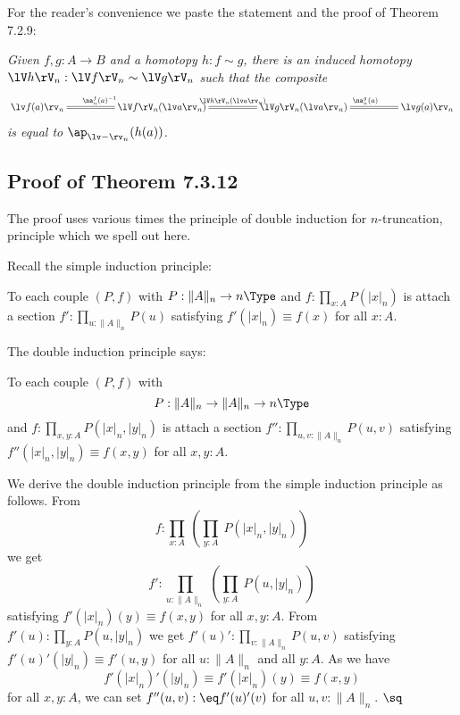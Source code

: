 \documentclass[12pt]{article}
\begin{document}
For the reader's convenience we paste the statement and the proof of Theorem 7.2.9:

\nn{} \emph{Given $f,g:A\to B$ and a homotopy $h:f\sim g$, there is an induced homotopy $\lV h\rV_n:\lV f\rV_n\sim\lV g\rV_n$ such that the composite
\begin{equation}\label{735}
\xymatrix@C=50pt{
\lv f(a)\rv_n\ar@{=}[r]^{\na^f_n(a)^{-1}}&
\lV f\rV_n(\lv a\rv_n)\ar@{=}[r]^{\lV h\rV_n(\lv a\rv_n)}&
\lV g\rV_n(\lv a\rv_n)\ar@{=}[r]^{\na^g_n(a)}&
\lv g(a)\rv_n}
\end{equation}
is equal to $\ap_{\lv-\rv_n}(h(a))$.}


\subsection{Proof of Theorem 7.3.12}

The proof uses various times the principle of double induction for $n$-truncation, principle which we spell out here.

Recall the simple induction principle:

To each couple $(P,f)$ with $P:\lVert A\rVert_n\to n\Type$ and $f:\prod_{x:A}P(\lvert x\rvert_n)$ is attach a section $f':\prod_{u:\lVert A\rVert_n}P(u)$ satisfying $f'(\lvert x\rvert_n)\equiv f(x)$ for all $x:A$.

The double induction principle says:

To each couple $(P,f)$ with $$P:\lVert A\rVert_n\to\lVert A\rVert_n\to n\Type$$ and $f:\prod_{x,y:A}P(\lvert x\rvert_n,\lvert y\rvert_n)$ is attach a section $f'':\prod_{u,v:\lVert A\rVert_n}P(u,v)$ satisfying $f''(\lvert x\rvert_n,\lvert y\rvert_n)\equiv f(x,y)$ for all $x,y:A$.

We derive the double induction principle from the simple induction principle as follows. From 
$$
f:\prod_{x:A}\ \left(\prod_{y:A}\ P(\lvert x\rvert_n,\lvert y\rvert_n)\right)
$$ 
we get 
$$
f':\prod_{u:\lVert A\rVert_n}\ \left(\prod_{y:A}\ P(u,\lvert y\rvert_n)\right)
$$ 
satisfying $f'(\lvert x\rvert_n)(y)\equiv f(x,y)$ for all $x,y:A$. From $f'(u):\prod_{y:A}P(u,\lvert y\rvert_n)$ we get $f'(u)':\prod_{v:\lVert A\rVert_n}P(u,v)$ satisfying $f'(u)'(\lvert y\rvert_n)\equiv f'(u,y)$ for all $u:\lVert A\rVert_n$ and all $y:A$. As we have 
$$
f'(\lvert x\rvert_n)'(\lvert y\rvert_n)\equiv f'(\lvert x\rvert_n)(y)\equiv f(x,y) 
$$ 
for all $x,y:A$, we can set $f''(u,v):\eq f'(u)'(v)$ for all $u,v:\lVert A\rVert_n$. $\sq$
\end{document}
